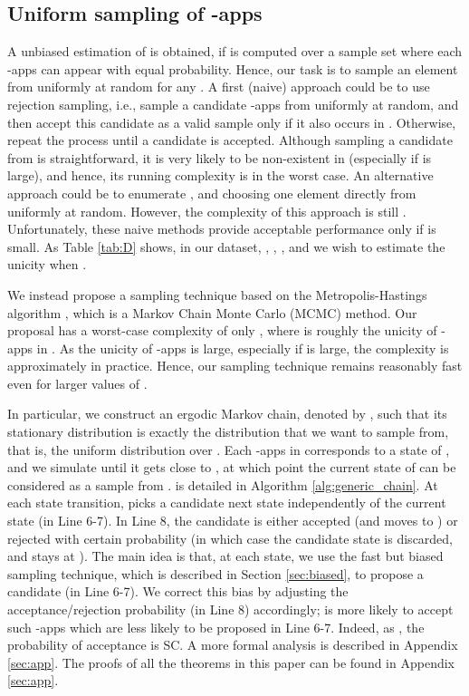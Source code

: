 \documentclass{acm_proc_article-sp}
\theoremstyle{plain}
\theoremstyle{plain}
\theoremstyle{plain}
\theoremstyle{plain}
\theoremstyle{plain}
\theoremstyle{plain}
\begin{document}
\subsection{Uniform sampling of -apps}
\label{sec:uniform_sampling}

 A unbiased estimation of  is obtained, if  is computed over a sample set where each -apps can appear with equal probability.
Hence, our task is to sample an element from  uniformly at random for any . A first (naive) approach could be to use rejection sampling, i.e., sample a candidate -apps from  uniformly at random, and then accept this candidate as a valid sample only if it also occurs in . Otherwise, repeat the process until a candidate is accepted.  Although sampling a candidate from  is straightforward, it is very likely to be non-existent in  (especially if  is large), and hence, its running complexity is  in the worst case. An alternative approach could be to enumerate , and choosing one element directly from  uniformly at random. However, the complexity of this approach is still . Unfortunately, these naive methods provide acceptable performance only if  is small. As Table \ref{tab:D} shows, in our dataset, , , , and we wish to estimate the unicity when . 

We instead propose a  sampling technique based on the Metropolis-Hastings algorithm \cite{MRRTT53jcp, Chib95}, which is a Markov Chain Monte Carlo (MCMC) method. Our proposal has a worst-case complexity of only , where  is roughly the unicity of -apps in .  As the unicity of -apps is large, especially if  is large, the complexity is approximately  in practice. Hence, our sampling technique remains reasonably fast even for larger values of .

In particular, we construct an ergodic Markov chain, denoted by ,
such that its stationary distribution  is exactly the distribution that we want to sample from, that is, the uniform distribution over .  Each -apps in  corresponds to a state of , and we simulate  until it gets close to , at which point the current state of  can be considered as a sample from . 
 is detailed in Algorithm \ref{alg:generic_chain}. At each state transition,  picks a candidate next state  independently of the current state  (in Line 6-7). In Line 8, the candidate is either accepted  (and  moves to ) or rejected with certain probability (in which case the candidate state is discarded, and  stays at  ). 
The main idea is that, at each state, we use the fast but biased sampling technique, which is described in Section \ref{sec:biased}, to propose a candidate  (in Line 6-7). We correct this bias by adjusting the acceptance/rejection probability (in Line 8) accordingly;  is more likely to accept such -apps which are less likely to be proposed in Line 6-7. Indeed, as  , the probability of acceptance is
SC. A more formal analysis is described in Appendix \ref{sec:app}. The proofs of all the theorems in this paper can be found in Appendix \ref{sec:app}.
\end{document}
